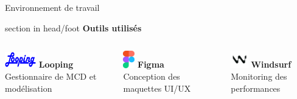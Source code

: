 \documentclass{beamer}
\begin{document}
\begin{frame}[label=environnement]{Environnement de travail}
	\begin{beamercolorbox}[wd=\paperwidth,ht=1.5em,dp=0.5em,leftskip=0.5cm]{section in head/foot}
  		\large \textbf{Outils utilisés}
	\end{beamercolorbox}
	\vspace{0.5em}
	\begin{center}
  		\begin{minipage}{0.9\textwidth}
  			\begin{columns}[T, onlytextwidth]
        				
        				\begin{minipage}[t][2cm][t]{\linewidth}
        					\raggedright
         				\includegraphics[width=1.35cm, height=0.75cm, keepaspectratio]{../img/logo_looping.png} 
         				\hspace{0.1cm} \textbf{Looping} \\ 
         				Gestionnaire de MCD et modélisation
          		  	\end{minipage}
          			\vspace{0.7em}
          			\pause
          			
        				\begin{minipage}[t][2cm][t]{\linewidth}
        					\raggedright
          				\includegraphics[height=0.75cm]{../img/logo_figma.png}
          				\hspace{0.95cm} \textbf{Figma} \\
          				Conception des maquettes UI/UX
          			\end{minipage}
          			\vspace{0.7em}
          			\pause
          		
          			\begin{minipage}[t][2cm][t]{\linewidth}
          				\raggedright
          				\includegraphics[width=0.75cm, height=0.75cm]{../img/logo_windsurf.png}
          				\hspace{0.6cm} \textbf{Windsurf} \\ 
          				Monitoring des performances
          			\end{minipage}
          			\pause
          			

\end{columns}
\end{minipage}
\end{center}
\end{frame}
\end{document}
